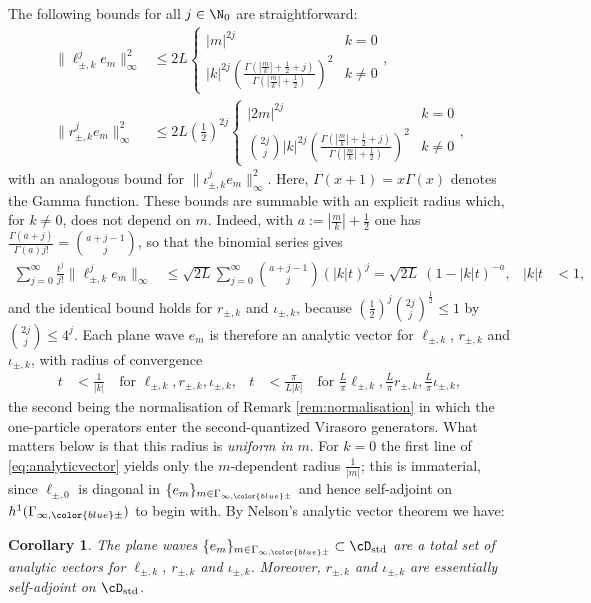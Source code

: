 \documentclass[a4paper, 11pt]{article}
\DeclareMathOperator{\1}{\mathds{1}}
\DeclareMathOperator{\std}{std}
\newtheorem{cor}[thm]{Corollary}
\begin{document}
The following bounds for all $j\in\N_{0}$ are straightforward:
\begin{align}
\label{eq:analyticvector}
\|\ell_{\pm,k}^{j}e_{m}\|_{\infty}^{2} & \leq 2L\left\{\begin{matrix} |m|^{2j} & k=0 \\ |k|^{2j}\left(\tfrac{\Gamma(|\frac{m}{k}|+\frac{1}{2}+j)}{\Gamma(|\frac{m}{k}|+\frac{1}{2})}\right)^{2} & k\neq0 \end{matrix}\right.,\\ \nonumber
\|r_{\pm,k}^{j}e_{m}\|_{\infty}^{2} & \leq 2L(\tfrac{1}{2})^{2j}\left\{\begin{matrix} |2 m|^{2j} & k=0 \\ \binom{2j}{j}|k|^{2j}\left(\tfrac{\Gamma(|\frac{m}{k}|+\frac{1}{2}+j)}{\Gamma(|\frac{m}{k}|+\frac{1}{2})}\right)^{2} & k\neq0 \end{matrix}\right.,
\end{align}
with an analogous bound for $\|\iota_{\pm,k}^{j}e_{m}\|_{\infty}^{2}$. Here, $\Gamma(x+1) = x\Gamma(x)$ denotes the Gamma function. These bounds are summable with an explicit radius which, for $k\neq0$, does not depend on $m$. Indeed, with $a := |\tfrac{m}{k}|+\tfrac{1}{2}$ one has $\tfrac{\Gamma(a+j)}{\Gamma(a)j!} = \binom{a+j-1}{j}$, so that the binomial series gives \begin{align}
\label{eq:analyticradius}
\sum_{j=0}^{\infty}\tfrac{t^{j}}{j!}\|\ell_{\pm,k}^{j}e_{m}\|_{\infty} & \leq \sqrt{2L}\sum_{j=0}^{\infty}\binom{a+j-1}{j}(|k|t)^{j} = \sqrt{2L}\!\ (1-|k|t)^{-a}, & |k|t & <1,
\end{align}
and the identical bound holds for $r_{\pm,k}$ and $\iota_{\pm,k}$, because $(\tfrac{1}{2})^{j}\binom{2j}{j}^{\frac{1}{2}}\leq1$ by $\binom{2j}{j}\leq4^{j}$. Each plane wave $e_{m}$ is therefore an analytic vector for $\ell_{\pm,k}$, $r_{\pm,k}$ and $\iota_{\pm,k}$, with radius of convergence
\begin{align}
\label{eq:analyticradiusvalue}
t & < \tfrac{1}{|k|}\quad\text{for }\ell_{\pm,k},r_{\pm,k},\iota_{\pm,k}, & t & < \tfrac{\pi}{L|k|}\quad\text{for }\tfrac{L}{\pi}\ell_{\pm,k},\tfrac{L}{\pi}r_{\pm,k},\tfrac{L}{\pi}\iota_{\pm,k},
\end{align}
the second being the normalisation of Remark \ref{rem:normalisation} in which the one-particle operators enter the second-quantized Virasoro generators. What matters below is that this radius is \emph{uniform in} $m$. For $k=0$ the first line of \eqref{eq:analyticvector} yields only the $m$-dependent radius $\tfrac{1}{|m|}$; this is immaterial, since $\ell_{\pm,0}$ is diagonal in $\{e_{m}\}_{m\in\Gamma_{\infty,{\color{blue}\pm}}}$ and hence self-adjoint on $h^{1}(\Gamma_{\infty,{\color{blue}\pm}})$ to begin with. By Nelson’s analytic vector theorem \cite{NelsonAnalyticVectors, ReedMethodsOfModern2} we have:
\begin{cor}
\label{cor:viraesa}
The plane waves $\{e_{m}\}_{m\in\Gamma_{\infty,{\color{blue}\pm}}}\subset\cD_{\std}$ are a total set of analytic vectors for $\ell_{\pm,k}$, $r_{\pm,k}$ and $\iota_{\pm,k}$. Moreover, $r_{\pm,k}$ and $\iota_{\pm,k}$ are essentially self-adjoint on $\cD_{\std}$.
\end{cor}
\end{document}
